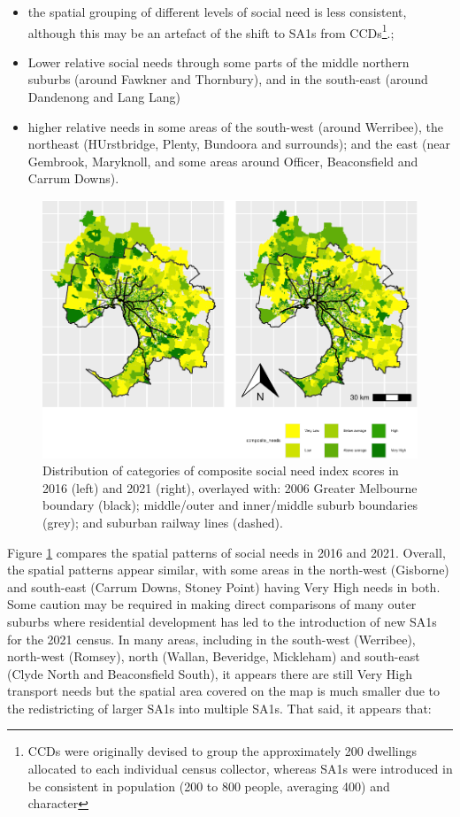 \documentclass[preprint, 3p,
authoryear]{elsarticle} %
\providecommand{\tightlist}{%
  \setlength{\itemsep}{0pt}\setlength{\parskip}{0pt}}
\begin{document}
\begin{itemize}
\tightlist
\item
  the spatial grouping of different levels of social need is less
  consistent, although this may be an artefact of the shift to SA1s from
  CCDs\footnote{CCDs were originally devised to group the approximately
    200 dwellings allocated to each individual census collector, whereas
    SA1s were introduced in be consistent in population (200 to 800
    people, averaging 400) and character\citep{ABS_SA1s_CCDs}}.;
\item
  Lower relative social needs through some parts of the middle northern
  suburbs (around Fawkner and Thornbury), and in the south-east (around
  Dandenong and Lang Lang)
\item
  higher relative needs in some areas of the south-west (around
  Werribee), the northeast (HUrstbridge, Plenty, Bundoora and
  surrounds); and the east (near Gembrook, Maryknoll, and some areas
  around Officer, Beaconsfield and Carrum Downs).
\end{itemize}

\begin{figure}
\includegraphics[width=0.9\linewidth]{Leveraging_GTFS_to_assess_transit_supply_Transport_Geography_files/figure-latex/Greater_Melbourne_2016_social_needs-1} \caption{Distribution of categories of composite social need index scores in 2016 (left) and 2021 (right), overlayed with: 2006 Greater Melbourne boundary (black); middle/outer and inner/middle suburb boundaries (grey); and suburban railway lines (dashed).}\label{fig:Greater_Melbourne_2016_social_needs}
\end{figure}

Figure \ref{fig:Greater_Melbourne_2016_social_needs} compares the
spatial patterns of social needs in 2016 and 2021. Overall, the spatial
patterns appear similar, with some areas in the north-west (Gisborne)
and south-east (Carrum Downs, Stoney Point) having Very High needs in
both. Some caution may be required in making direct comparisons of many
outer suburbs where residential development has led to the introduction
of new SA1s for the 2021 census. In many areas, including in the
south-west (Werribee), north-west (Romsey), north (Wallan, Beveridge,
Mickleham) and south-east (Clyde North and Beaconsfield South), it
appears there are still Very High transport needs but the spatial area
covered on the map is much smaller due to the redistricting of larger
SA1s into multiple SA1s. That said, it appears that:
\end{document}
